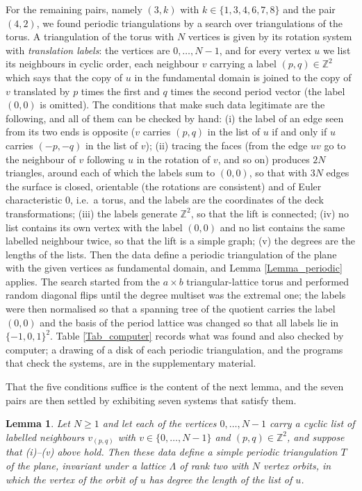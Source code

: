\documentclass[12pt,a4paper]{article}%
\newtheorem{lemma}[theorem]{Lemma}
\begin{document}
For the remaining pairs, namely $(3,k)$ with $k\in \{1,3,4,6,7,8\}$ and the pair $(4,2)$, we found periodic
triangulations by a search over triangulations of the torus. A
triangulation of the torus with $N$ vertices is given by its rotation system with \emph{translation labels}: the
vertices are $0,\ldots ,N-1$, and for every vertex $u$ we list its neighbours in cyclic order, each neighbour $v$
carrying a label $(p,q)\in \mathbb{Z}^{2}$ which says that the copy of $u$ in the fundamental domain is joined to the
copy of $v$ translated by $p$ times the first and $q$ times the second period vector (the label $(0,0)$ is omitted).
The conditions that make such data legitimate are the following, and all of them can be checked by
hand: (i) the label of an edge seen from its two ends is
opposite ($v$ carries $(p,q)$ in the list of $u$ if and only if $u$ carries $(-p,-q)$ in the list of $v$); (ii) tracing
the faces (from the edge $uv$ go to the neighbour of $v$ following $u$ in the rotation of $v$, and so on) produces $2N$
triangles, around each of which the labels sum to $(0,0)$, so that with $3N$ edges the surface is closed, orientable
(the rotations are consistent) and of Euler characteristic $0$, i.e.\ a torus, and the labels are the coordinates of
the deck transformations; (iii) the labels generate $\mathbb{Z}^{2}$, so that the lift is connected; (iv) no list
contains its own vertex with the label $(0,0)$ and no list contains the same labelled neighbour twice, so that the lift
is a simple graph; (v) the degrees are the lengths of the lists. Then the data define a periodic triangulation of the
plane with the given vertices as fundamental domain, and Lemma \ref{Lemma_periodic} applies. The search started
from the $a\times b$ triangular-lattice torus and performed random diagonal flips until the degree multiset was
the extremal one; the labels were then normalised so that a spanning tree of the quotient carries the label
$(0,0)$ and the basis of the period lattice was changed so that all labels lie in $\{-1,0,1\}^{2}$. Table
\ref{Tab_computer} records what was found and also checked by computer; a drawing of a disk of each
periodic triangulation, and the programs that check the systems, are in the supplementary material.

That the five conditions suffice is the content of the next lemma, and the seven pairs are then settled by
exhibiting seven systems that satisfy them.

\begin{lemma}
\label{Lemma_torus}Let $N\geq 1$ and let each of the vertices $0,\ldots ,N-1$ carry a cyclic list of labelled
neighbours $v_{(p,q)}$ with $v\in \{0,\ldots ,N-1\}$ and $(p,q)\in \mathbb{Z}^{2}$, and suppose that
\textup{(i)}--\textup{(v)} above hold. Then these data define a simple periodic triangulation $T$ of the
plane, invariant under a lattice $\Lambda $ of rank two with $N$ vertex orbits, in which the vertex of the
orbit of $u$ has degree the length of the list of $u$.
\end{lemma}
\end{document}
